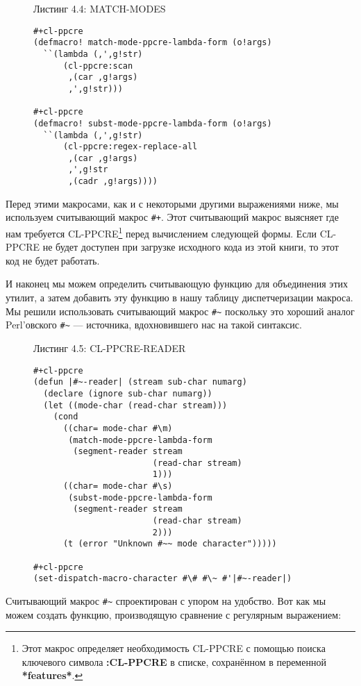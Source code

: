 \begin{figure}Листинг 4.4: MATCH-MODES\label{listing_4.4}
\listbegin
\begin{verbatim}
#+cl-ppcre
(defmacro! match-mode-ppcre-lambda-form (o!args)
  ``(lambda (,',g!str)
      (cl-ppcre:scan
       ,(car ,g!args)
       ,',g!str)))

#+cl-ppcre
(defmacro! subst-mode-ppcre-lambda-form (o!args)
  ``(lambda (,',g!str)
      (cl-ppcre:regex-replace-all
       ,(car ,g!args)
       ,',g!str
       ,(cadr ,g!args))))
\end{verbatim}
\listend
\end{figure}

Перед этими макросами, как и с некоторыми другими выражениями ниже, мы используем считывающий макрос \verb"#+". Этот считывающий макрос выясняет где нам требуется CL-PPCRE\footnote{Этот макрос определяет необходимость CL-PPCRE с помощью поиска ключевого символа \textbf{:CL-PPCRE} в списке, сохранённом в переменной \textbf{*features*}.} перед вычислением следующей формы. Если CL-PPCRE не будет доступен при загрузке исходного кода из этой книги, то этот код не будет работать.

И наконец мы можем определить считывающую функцию для объединения этих утилит, а затем добавить эту функцию в нашу таблицу диспетчеризации макроса. Мы решили использовать считывающий макрос \verb"#~" поскольку это хороший аналог Perl'овского \verb"#~" --- источника, вдохновившего нас на такой синтаксис.

\begin{figure}Листинг 4.5: CL-PPCRE-READER\label{listing_4.5}
\listbegin
\begin{verbatim}
#+cl-ppcre
(defun |#~-reader| (stream sub-char numarg)
  (declare (ignore sub-char numarg))
  (let ((mode-char (read-char stream)))
    (cond
      ((char= mode-char #\m)
       (match-mode-ppcre-lambda-form
        (segment-reader stream
                        (read-char stream)
                        1)))
      ((char= mode-char #\s)
       (subst-mode-ppcre-lambda-form
        (segment-reader stream
                        (read-char stream)
                        2)))
      (t (error "Unknown #~~ mode character")))))

#+cl-ppcre
(set-dispatch-macro-character #\# #\~ #'|#~-reader|)
\end{verbatim}
\listend
\end{figure}

Считывающий макрос \verb"#~" спроектирован с упором на удобство. Вот как мы можем создать функцию, производящую сравнение с регулярным выражением:


